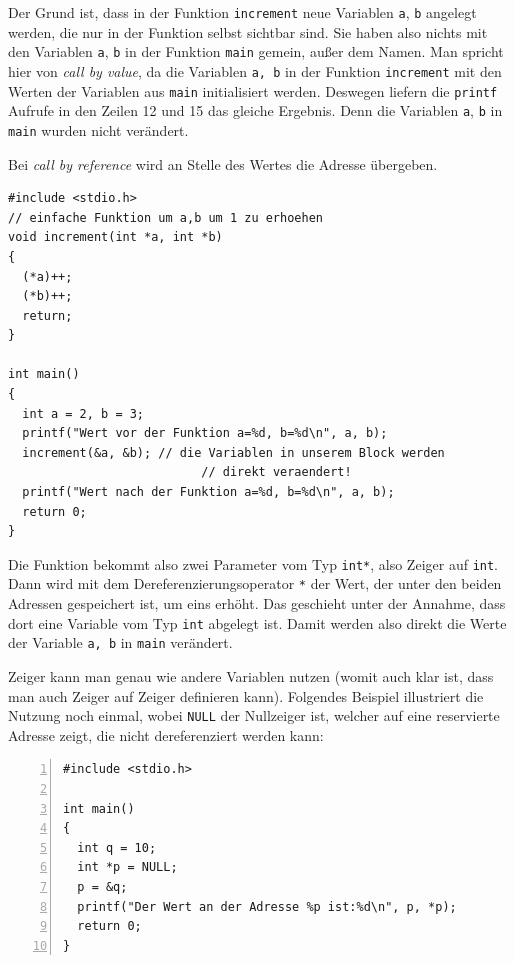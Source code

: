 Der Grund ist, dass in der Funktion \verb|increment| neue Variablen \verb|a|, \verb|b| angelegt werden, die nur in der Funktion selbst sichtbar sind.
Sie haben also nichts mit den Variablen \verb|a|, \verb|b| in der Funktion \verb|main| gemein, außer dem Namen.
Man spricht hier von \emph{call by value}, da die Variablen \verb|a, b| in der Funktion \verb|increment| mit den Werten der Variablen aus \verb|main| initialisiert werden.
Deswegen liefern die \verb|printf| Aufrufe in den Zeilen 12 und 15 das gleiche Ergebnis.
Denn die Variablen \verb|a|, \verb|b| in \verb|main| wurden nicht verändert.

Bei \emph{call by reference} wird an Stelle des Wertes die Adresse übergeben.

\begin{minipage}{\linewidth}
\begin{lstlisting}
#include <stdio.h>
// einfache Funktion um a,b um 1 zu erhoehen
void increment(int *a, int *b)
{
  (*a)++;
  (*b)++;
  return;
}

int main()
{
  int a = 2, b = 3;
  printf("Wert vor der Funktion a=%d, b=%d\n", a, b);
  increment(&a, &b); // die Variablen in unserem Block werden
                           // direkt veraendert!
  printf("Wert nach der Funktion a=%d, b=%d\n", a, b);
  return 0;
}
\end{lstlisting}
\end{minipage}
Die Funktion bekommt also zwei Parameter vom Typ \verb|int*|, also Zeiger auf \verb|int|.
Dann wird mit dem Dereferenzierungsoperator \verb|*| der Wert, der unter den beiden Adressen gespeichert ist, um eins erhöht.
Das geschieht unter der Annahme, dass dort eine Variable vom Typ \verb|int| abgelegt ist.
Damit werden also direkt die Werte der Variable \verb|a, b| in \verb|main| verändert.

Zeiger kann man genau wie andere Variablen nutzen (womit auch klar ist, dass man auch Zeiger auf Zeiger definieren kann).
Folgendes Beispiel illustriert die Nutzung noch einmal, wobei \verb|NULL| der Nullzeiger ist, welcher auf eine reservierte Adresse zeigt, die nicht dereferenziert werden kann:

\begin{minipage}{\linewidth}
\begin{lstlisting}[numbers=left]
#include <stdio.h>

int main()
{
  int q = 10;
  int *p = NULL;
  p = &q;
  printf("Der Wert an der Adresse %p ist:%d\n", p, *p);
  return 0;
}
\end{lstlisting}
\end{minipage}

